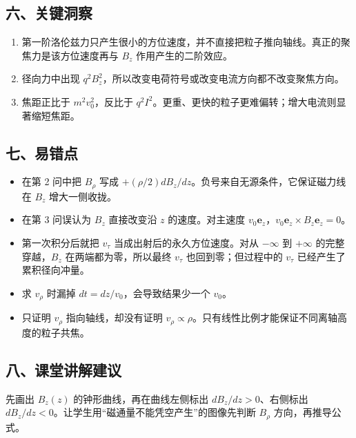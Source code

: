 \documentclass[12pt,a4paper,UTF8]{ctexart}
\newcommand{\tightlist}{\setlength{\itemsep}{0pt}\setlength{\parskip}{0pt}}
\begin{document}
\subsection{六、关键洞察}\label{ux516dux5173ux952eux6d1eux5bdf-4}

\begin{enumerate}
\def\labelenumi{\arabic{enumi}.}
\tightlist
\item
  第一阶洛伦兹力只产生很小的方位速度，并不直接把粒子推向轴线。真正的聚焦力是该方位速度再与
  \(B_z\) 作用产生的二阶效应。
\item
  径向力中出现
  \(q^2B_z^2\)，所以改变电荷符号或改变电流方向都不改变聚焦方向。
\item
  焦距正比于 \(m^2v_0^2\)，反比于
  \(q^2I^2\)。更重、更快的粒子更难偏转；增大电流则显著缩短焦距。
\end{enumerate}

\subsection{七、易错点}\label{ux4e03ux6613ux9519ux70b9-4}

\begin{itemize}
\tightlist
\item
  在第 2 问中把 \(B_\rho\) 写成
  \(+(\rho/2)dB_z/dz\)。负号来自无源条件，它保证磁力线在 \(B_z\)
  增大一侧收拢。
\item
  在第 3 问误认为 \(B_z\) 直接改变沿 \(z\) 的速度。对主速度
  \(v_0\bm e_z\)，\(v_0\bm e_z\times B_z\bm e_z=0\)。
\item
  第一次积分后就把 \(v_\tau\) 当成出射后的永久方位速度。对从 \(-\infty\)
  到 \(+\infty\) 的完整穿越，\(B_z\) 在两端都为零，所以最终 \(v_\tau\)
  也回到零；但过程中的 \(v_\tau\) 已经产生了累积径向冲量。
\item
  求 \(v_\rho\) 时漏掉 \(dt=dz/v_0\)，会导致结果少一个 \(v_0\)。
\item
  只证明 \(v_\rho\) 指向轴线，却没有证明
  \(v_\rho\propto\rho\)。只有线性比例才能保证不同离轴高度的粒子共焦。
\end{itemize}

\subsection{八、课堂讲解建议}\label{ux516bux8bfeux5802ux8bb2ux89e3ux5efaux8bae-4}

先画出 \(B_z(z)\) 的钟形曲线，再在曲线左侧标出 \(dB_z/dz>0\)、右侧标出
\(dB_z/dz<0\)。让学生用``磁通量不能凭空产生''的图像先判断 \(B_\rho\)
方向，再推导公式。
\end{document}
